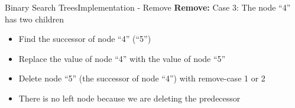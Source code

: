 
\begin{frame}{Binary Search Trees}{Implementation - Remove}
  \textbf{Remove:} Case 3: The node \enquote{4} has two children\\
  \begin{itemize}
    \item
      Find the {\color{Mittel-Blau}successor} of node \enquote{4} (\enquote{5})
    \item
      Replace the value of node \enquote{4} with the value of node \enquote{5}
    \item
      Delete node \enquote{5} (the {\color{Mittel-Blau}successor} of node
      \enquote{4}) with remove-case 1 or 2
    \item
      There is no left node because we are deleting the
      {\color{Mittel-Blau}predecessor}
  \end{itemize}
  \vspace{-1.5em}
  \begin{figure}
    
    \label{fig:binary_search_trees:binary_tree_remove_two_children_result}
  \end{figure}
\end{frame}


